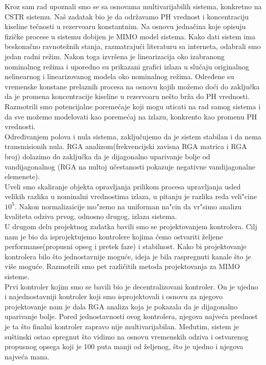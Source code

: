 \documentclass[a4paper,11pt]{article}
\theoremstyle{definition} \newtheorem{deff}{Definicija}[section]
\theoremstyle{definition} \newtheorem{prim}[deff]{Primer}
\theoremstyle{plain} \newtheorem{teor}[deff]{Teorema}
\begin{document}
			Kroz sam rad upoznali smo se sa osnovama multivarijabilih sistema, konkretno na CSTR sistemu. Naš zadatak bio je da održavamo PH vrednost i koncentraciju kiseline tečnosti u rezervoaru konstantnim. Na osnovu jednačina koje opisuju fizičke procese u sistemu dobijen je MIMO model sistema. Kako dati sistem ima beskonačno ravnotežnih stanja, razmatrajući literaturu sa interneta, odabrali smo jedan radni režim. Nakon toga izvršena je linearizacija oko izabranong nominalnog režima i uporedno su prikazani grafici izlaza u slučaju originalnog nelinearnog i linearizovanog modela oko nominalnog režima. Određene su vremenske konstane prelaznih procesa na osnovu kojih možemo doći do zaključka da je promena koncentracije kiseline u rezervoaru nešto brža do PH vrednosti. \\
			
			Razmotrili smo potencijalne poremećaje koji mogu uticati na rad samog sistema i da sve možemo modelovati kao poremećaj na izlazu, konkrento kao promenu PH vrednosti. \\
			
			Određivanjem polova i nula sistema, zaključujemo da je sistem stabilan i da nema transmisionih nula. RGA analizom(frekvencijski zavisna RGA matrica i RGA broj) dolazimo do zaključka da je dijagonalno uparivanje bolje od vandijagonalnog (RGA na nultoj učestanosti pokazuje negativne vandijagonalne elemenete). \\
			
			Uveli smo skaliranje objekta opravljanja prilikom procesa upravljanja usled velikih razlika u nominalni vrednostima izlaza, u pitanju je razlika reda veli"cine $10^5$. Nakon normalizaicije mo"zemo na uniforman na"cin da vr"simo analizu kvaliteta odziva prvog, odnosno drugog, izlaza sistema.\\
			
			U drugom delu projektnog zadatka bavili smo se projektovanjem kontrolera. Cilj nam je bio da isprojektujemo kontrolere kojima ćemo ostvariti željene performanse(propusni opseg i pretek faze) i stabilnost. Kako bi projektovanje kontrolera bilo što jednostavnije moguće, ideja je bila raspregnuti kanale što je više moguće. Razmotrili smo pet različitih metoda projektovanja za MIMO sisteme. \\
			
			Prvi kontroler kojim smo se bavili bio je decentralizovani kontroler. On je ujedno i najednostavniji kontroler koji smo isprojektovali i osnovu za njegovo projektovanje nam je dala RGA analiza koja je pokazala da je dijagonalno uparivanje bolje. Pored jednostavnosti ovog kontrolera, njegova najveća prednost je ta što finalni kontroler zapravo nije multivarijabilan. Međutim, sistem je suštinski ostao spregnut što vidimo na osnovu vremenskih odziva i ostvarenog propusnog opsega koji je 100 puta manji od željenog, što je ujedno i njegova najveća mana. \\
			
\end{document}
